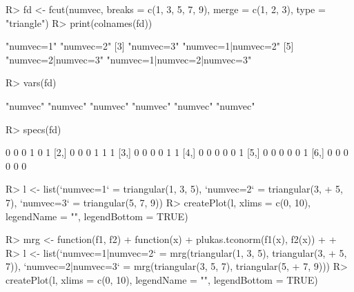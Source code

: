 \documentclass{article}\usepackage[]{graphicx}\usepackage[]{color}
\begin{document}
\begin{Schunk}
% --begin: "fcut.merge2"
\begin{Sinput}
R> fd <- fcut(numvec, breaks = c(1, 3, 5, 7, 9), merge = c(1, 2, 3), type = "triangle")
R> print(colnames(fd))
\end{Sinput}
\begin{Soutput}
[1] "numvec=1"                   "numvec=2"                  
[3] "numvec=3"                   "numvec=1|numvec=2"         
[5] "numvec=2|numvec=3"          "numvec=1|numvec=2|numvec=3"
\end{Soutput}
%
% --end: "fcut.merge2"
\end{Schunk}

\begin{Schunk}
% --begin: "fcut.varsspecs"
\begin{Sinput}
R> vars(fd)
\end{Sinput}
\begin{Soutput}
[1] "numvec" "numvec" "numvec" "numvec" "numvec" "numvec"
\end{Soutput}
\begin{Sinput}
R> specs(fd)
\end{Sinput}
\begin{Soutput}
     [,1] [,2] [,3] [,4] [,5] [,6]
[1,]    0    0    0    1    0    1
[2,]    0    0    0    1    1    1
[3,]    0    0    0    0    1    1
[4,]    0    0    0    0    0    1
[5,]    0    0    0    0    0    1
[6,]    0    0    0    0    0    0
\end{Soutput}
%
% --end: "fcut.varsspecs"
\end{Schunk}


\begin{Schunk}
\begin{Sinput}
R> l <- list(`numvec=1` = triangular(1, 3, 5), `numvec=2` = triangular(3, 
+      5, 7), `numvec=3` = triangular(5, 7, 9))
R> createPlot(l, xlims = c(0, 10), legendName = "", legendBottom = TRUE)
\end{Sinput}
\end{Schunk}

\begin{Schunk}
\begin{Sinput}
R> mrg <- function(f1, f2) {
+      function(x) {
+          plukas.tconorm(f1(x), f2(x))
+      }
+  }
R> l <- list(`numvec=1|numvec=2` = mrg(triangular(1, 3, 5), triangular(3, 
+      5, 7)), `numvec=2|numvec=3` = mrg(triangular(3, 5, 7), triangular(5, 
+      7, 9)))
R> createPlot(l, xlims = c(0, 10), legendName = "", legendBottom = TRUE)
\end{Sinput}
\end{Schunk}
\end{document}
